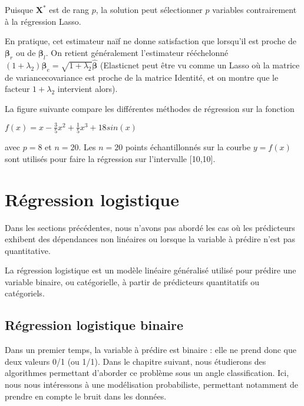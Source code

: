 \documentclass[letterpaper,10pt,english]{jupyterBook}
\begin{document}
\sphinxAtStartPar
Puisque \(\mathbf X^*\) est de rang \(p\), la solution peut sélectionner \(p\) variables contrairement à la régression Lasso.

\sphinxAtStartPar
En pratique, cet estimateur naïf ne donne satisfaction que lorsqu’il est proche de \(\boldsymbol\beta_r\) ou de \(\boldsymbol\beta_l\). On retient généralement l’estimateur rééchelonné \((1+\lambda_2)\boldsymbol\beta_e = \sqrt{1+\lambda_2}\hat{\boldsymbol\beta}\) (Elasticnet peut être vu comme un Lasso où la matrice de variance\sphinxhyphen{}covariance est proche de la matrice Identité, et on montre que le facteur \(1+\lambda_2\) intervient alors).

\sphinxAtStartPar
La figure suivante compare les différentes méthodes de régression sur la fonction

\sphinxAtStartPar
\(f(x) = x-\frac35 x^2+\frac15x^3 + 18sin(x)\)

\sphinxAtStartPar
avec \(p=8\) et \(n=20\). Les \(n=20\) points  échantillonnés sur la courbe \(y=f(x)\) sont utilisés pour faire la régression sur l’intervalle {[}\sphinxhyphen{}10,10{]}.

\sphinxAtStartPar
{}


\section{Régression logistique}
\label{\detokenize{regression:regression-logistique}}
\ignorespaces 
\sphinxAtStartPar
Dans les sections précédentes, nous n’avons pas abordé les cas où les prédicteurs exhibent des dépendances non linéaires ou lorsque la variable à prédire n’est pas quantitative.

\sphinxAtStartPar
La régression logistique est un modèle linéaire généralisé utilisé pour prédire une variable binaire, ou catégorielle, à partir de prédicteurs quantitatifs ou catégoriels.


\subsection{Régression logistique binaire}
\label{\detokenize{regression:regression-logistique-binaire}}
\sphinxAtStartPar
Dans un premier temps, la variable à prédire est binaire : elle ne prend donc que deux valeurs 0/1 (ou \sphinxhyphen{}1/1). Dans le chapitre suivant, nous étudierons des algorithmes permettant d’aborder ce problème sous un angle classification. Ici, nous nous intéressons à une modélisation probabiliste, permettant notamment de prendre en compte le bruit dans les données.
\end{document}

